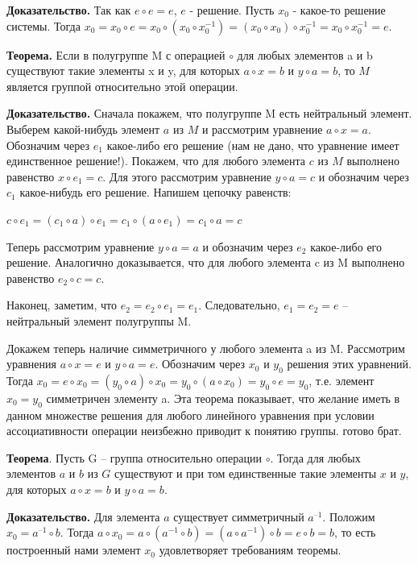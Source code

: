 \documentclass[a4paper]{article}
\begin{document}
{\begin{small}
\textbf{Доказательство.} Так как $e \circ e = e$, $e$ - решение. Пусть $x_0$ - какое-то решение системы. Тогда $x_0 = x_0 \circ e = x_0 \circ (x_0 \circ x_0^{-1}) = (x_0 \circ x_0) \circ x_0^{-1} = x_0 \circ x_0^{-1} = e$.

\textbf{Теорема.} Если в полугруппе M с операцией $\circ$ для любых элементов a и b
существуют такие элементы x и y, для которых $a \circ x = b$ и $y \circ a  = b$, то $M$ является группой относительно этой операции.

\textbf{Доказательство.} Сначала покажем, что полугруппе M есть нейтральный
элемент. Выберем какой-нибудь элемент $a$ из $M$ и рассмотрим уравнение $a \circ x = a$. Обозначим через $e_1$ какое-либо его решение (нам не дано, что уравнение
имеет единственное решение!). Покажем, что для любого элемента $c$ из $M$
выполнено равенство $x \circ e_1 = c$.  Для этого рассмотрим уравнение $y \circ a  = c$ и обозначим через $c_1$ какое-нибудь его решение. Напишем цепочку равенств:

$c \circ e_1 = (c_1 \circ a ) \circ e_1 = c_1 \circ ( a \circ e_1) = c_1 \circ a = c$

Теперь рассмотрим уравнение $y \circ a = a$ и обозначим через $e_2$ какое-либо его
решение. Аналогично доказывается, что для любого элемента c из M
выполнено равенство $e_2 \circ c = c$.

Наконец, заметим, что $e_2 = e_2 \circ e_1 = e_1$. Следовательно, $e_1 = e_2 = e$ –
нейтральный элемент полугруппы M.

Докажем теперь наличие симметричного у любого элемента a из M.
Рассмотрим уравнения $a \circ x = e$ и $y \circ a = e$. Обозначим через $x_0$ и $y_0$ решения
этих уравнений. Тогда $x_0 = e \circ x_0 = (y_0 \circ a) \circ x_0 = y_0 \circ (a \circ x_0) = y_0 \circ e = y_0$, т.е.
элемент $x_0 = y_0$ симметричен элементу a.
Эта теорема показывает, что желание иметь в данном множестве решения
для любого линейного уравнения при условии ассоциативности операции
неизбежно приводит к понятию группы. готово брат.

\textbf{Теорема}. Пусть G – группа относительно операции $\circ$. Тогда для любых
элементов $a$ и $b$ из $G$ существуют и при том единственные такие элементы $x$ и $y$,
для которых $a 
\circ x = b$ и $y \circ a = b.$

\textbf{Доказательство.}  Для элемента $a$ существует симметричный $a^{–1}$. Положим
$x_0 = a^{–1} \circ b.$ Тогда
$a \circ x_0 = a \circ (a^{-1} \circ b) = (a \circ a^{-1} ) \circ b = e \circ b = b$, то есть построенный нами элемент $x_0$ удовлетворяет требованиям теоремы.


\end{small}}
\end{document}
